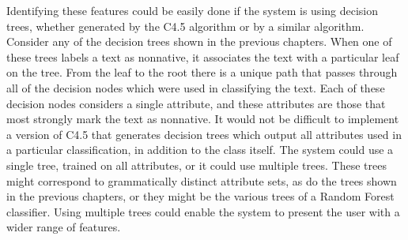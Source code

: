 \documentclass[main.tex]{subfiles}
\begin{document}
Identifying these features could be easily done if the system is using decision trees, whether generated by the C4.5 algorithm or by a similar algorithm. Consider any of the decision trees shown in the previous chapters. When one of these trees labels a text as nonnative, it associates the text with a particular leaf on the tree. From the leaf to the root there is a unique path that passes through all of the decision nodes which were used in classifying the text. Each of these decision nodes considers a single attribute, and these attributes are those that most strongly mark the text as nonnative. It would not be difficult to implement a version of C4.5 that generates decision trees which output all attributes used in a particular classification, in addition to the class itself. The system could use a single tree, trained on all attributes, or it could use multiple trees. These trees might correspond to grammatically distinct attribute sets, as do the trees shown in the previous chapters, or they might be the various trees of a Random Forest classifier. Using multiple trees could enable the system to present the user with a wider range of features.
\end{document}
